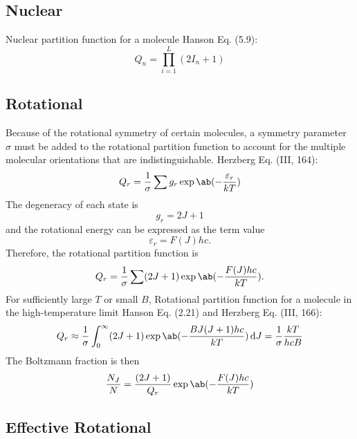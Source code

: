 \documentclass[11pt, twoside, fleqn]{report}
\begin{document}
\subsection{Nuclear}

Nuclear partition function for a molecule Hanson Eq. (5.9):
\begin{equation*}
    Q_{n} = \prod_{i = 1}^{L} (2I_{n} + 1)
\end{equation*}

\subsection{Rotational}
Because of the rotational symmetry of certain molecules, a symmetry parameter $\sigma$ must be added to the rotational partition function to account for the multiple molecular orientations that are indistinguishable.
Herzberg Eq. (III, 164):
\begin{equation*}
    Q_{r} = \frac{1}{\sigma} \sum g_{r}\exp\ab(-\frac{\varepsilon_{r}}{kT})
\end{equation*}
The degeneracy of each state is
\begin{equation*}
    g_{r} = 2J + 1
\end{equation*}
and the rotational energy can be expressed as the term value
\begin{equation*}
    \varepsilon_{r} = F(J)hc.
\end{equation*}
Therefore, the rotational partition function is
\begin{equation*}
    Q_{r} = \frac{1}{\sigma} \sum (2J + 1)\exp\ab(-\frac{F(J)hc}{kT}).
\end{equation*}
For sufficiently large $T$ or small $B$,
Rotational partition function for a molecule in the high-temperature limit Hanson Eq. (2.21) and Herzberg Eq. (III, 166):
\begin{equation*}
    Q_{r} \approx \frac{1}{\sigma} \int_{0}^{\infty} (2J + 1)\exp\ab(-\frac{BJ(J + 1)hc}{kT}) \odif{J} = \frac{1}{\sigma}\frac{kT}{hcB}
\end{equation*}
The Boltzmann fraction is then
\begin{equation*}
    \frac{N_{J}}{N} = \frac{(2J + 1)}{Q_{r}}\exp\ab(-\frac{F(J)hc}{kT})
\end{equation*}

\subsection{Effective Rotational}
\end{document}
